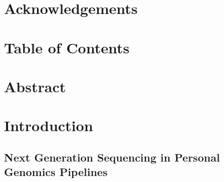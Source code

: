 \documentclass{article}
\begin{document}
\section*{Acknowledgements}
\newpage
\section*{Table of Contents}
\tableofcontents
\newpage
\section*{Abstract}
\doublespace
\normalsize
{} 
\section{Introduction}
\subsection{Next Generation Sequencing in Personal Genomics Pipelines}
\end{document}
